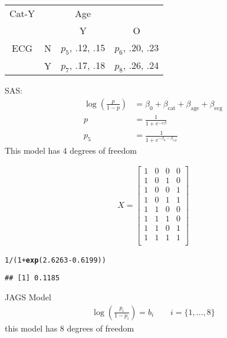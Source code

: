 \documentclass[12pt,letterpaper,oneside]{article}\usepackage{graphicx, color}
\makeatletter
\newcommand{\hlfunctioncall}[1]{\textcolor[rgb]{0.501960784313725,0,0.329411764705882}{\textbf{#1}}}%
\newenvironment{kframe}{%
 \def\at@end@of@kframe{}%
 \ifinner\ifhmode%
  \def\at@end@of@kframe{\end{minipage}}%
  \begin{minipage}{\columnwidth}%
 \fi\fi%
 \def\FrameCommand##1{\hskip\@totalleftmargin \hskip-\fboxsep
 \colorbox{shadecolor}{##1}\hskip-\fboxsep
     \hskip-\linewidth \hskip-\@totalleftmargin \hskip\columnwidth}%
 \MakeFramed {\advance\hsize-\width
   \@totalleftmargin\z@ \linewidth\hsize
   \@setminipage}}%
 {\par\unskip\endMakeFramed%
 \at@end@of@kframe}
\newenvironment{knitrout}{}{} %
\makeatother
\begin{document}
\begin{tabular}{cccc}
\hline
Cat-Y &  & Age & \\
      &  & Y & O\\
ECG   & N & $p_5$, .12, .15 & $p_6$, .20, .23 \\
      & Y & $p_7$, .17, .18& $p_8$,  .26, .24\\
      \hline
\end{tabular}

SAS:
\begin{align*}
\log\left(\frac{p}{1-p}\right) & =\beta_{0}+\beta_{\text{cat}}+\beta_{\text{age}}+\beta_{\text{ecg}}\\
    p & =\frac{1}{1+e^{-x\beta}}\\
    p_{5} &= \frac{1}{1+e^{-\beta_{0}-\beta_{\text{cat}}}}
\end{align*}
This model has 4 degrees of freedom

\begin{align*}
    X = \begin{bmatrix}
        1 & 0 & 0 & 0\\
        1 & 0 & 1 & 0\\
        1 & 0 & 0 & 1\\
        1 & 0 & 1 & 1\\
        1 & 1 & 0 & 0\\
        1 & 1 & 1 & 0\\
        1 & 1 & 0 & 1\\
        1 & 1 & 1 & 1\\
    \end{bmatrix}
\end{align*}
\begin{knitrout}\scriptsize
{}\color{fgcolor}\begin{kframe}
\begin{alltt}
1/(1 + \hlfunctioncall{exp}(2.6263 - 0.6199))
\end{alltt}
\begin{verbatim}
## [1] 0.1185
\end{verbatim}
\end{kframe}
\end{knitrout}


JAGS Model
\begin{align*}
    \log\left(\frac{p_{i}}{1-p_{i}}\right)=b_{i}\qquad i=\{1,\ldots,8\}
\end{align*}
this model has 8 degrees of freedom
\end{document}
